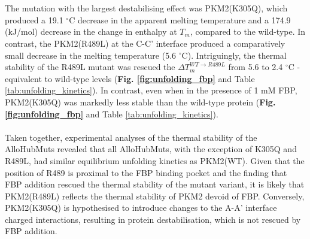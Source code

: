 %
%
\\\\
%
%
The mutation with the largest destabilising effect was PKM2(K305Q), which produced a 19.1 $^\circ$C decrease in the apparent melting temperature and a 174.9 (kJ/mol) decrease in the change in enthalpy at $T_m$, compared to the wild-type. In contrast, the PKM2(R489L) at the C-C' interface produced a comparatively small decrease in the melting temperature (5.6 $^\circ$C). Intriguingly, the thermal stability of the R489L mutant was rescued the $\Delta T_{m}^{WT \rightarrow R489L}$ from 5.6 to 2.4 $^\circ$C - equivalent to wild-type levels (\textbf{Fig. \ref{fig:unfolding_fbp}} and Table \ref{tab:unfolding_kinetics}). In contrast, even when in the presence of 1 mM FBP, PKM2(K305Q) was markedly less stable than the wild-type protein (\textbf{Fig. \ref{fig:unfolding_fbp}} and Table \ref{tab:unfolding_kinetics}).
%
%
\\\\
%
%
Taken together, experimental analyses of the thermal stability of the AlloHubMuts revealed that all AlloHubMuts, with the exception of K305Q and R489L, had similar equilibrium unfolding kinetics as PKM2(WT). Given that the position of R489 is proximal to the FBP binding pocket and the finding that FBP addition rescued the thermal stability of the mutant variant, it is likely that PKM2(R489L) reflects the thermal stability of PKM2 devoid of FBP. Conversely, PKM2(K305Q) is hypothesised to introduce changes to the A-A' interface charged interactions, resulting in protein destabilisation, which is not rescued by FBP addition. 
%
%
